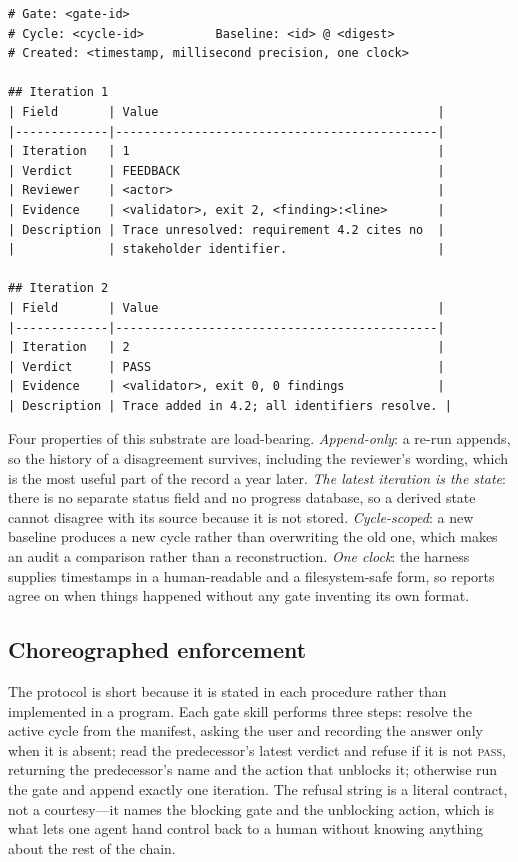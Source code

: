 \documentclass[10pt,a4paper]{article}
\theoremstyle{definition}
\theoremstyle{plain}
\theoremstyle{principle}
\begin{document}
\begin{lstlisting}[caption={A gate report after two iterations. The latest iteration \emph{is} the
gate state; earlier iterations are history that is never edited.},label={lst:report}]
# Gate: <gate-id>
# Cycle: <cycle-id>          Baseline: <id> @ <digest>
# Created: <timestamp, millisecond precision, one clock>

## Iteration 1
| Field       | Value                                       |
|-------------|---------------------------------------------|
| Iteration   | 1                                           |
| Verdict     | FEEDBACK                                    |
| Reviewer    | <actor>                                     |
| Evidence    | <validator>, exit 2, <finding>:<line>       |
| Description | Trace unresolved: requirement 4.2 cites no  |
|             | stakeholder identifier.                     |

## Iteration 2
| Field       | Value                                       |
|-------------|---------------------------------------------|
| Iteration   | 2                                           |
| Verdict     | PASS                                        |
| Evidence    | <validator>, exit 0, 0 findings             |
| Description | Trace added in 4.2; all identifiers resolve. |
\end{lstlisting}

Four properties of this substrate are load-bearing. \emph{Append-only}: a re-run appends, so the
history of a disagreement survives, including the reviewer's wording, which is the most useful
part of the record a year later. \emph{The latest iteration is the state}: there is no separate
status field and no progress database, so a derived state cannot disagree with its source because
it is not stored. \emph{Cycle-scoped}: a new baseline produces a new cycle rather than overwriting
the old one, which makes an audit a comparison rather than a reconstruction. \emph{One clock}: the
harness supplies timestamps in a human-readable and a filesystem-safe form, so reports agree on
when things happened without any gate inventing its own format.

\subsection{Choreographed enforcement}

The protocol is short because it is stated in each procedure rather than implemented in a program.
Each gate skill performs three steps: resolve the active cycle from the manifest, asking the user
and recording the answer only when it is absent; read the predecessor's latest verdict and refuse
if it is not \textnormal{\textsc{pass}}, returning the predecessor's name and the action that unblocks it;
otherwise run the gate and append exactly one iteration. The refusal string is a literal contract,
not a courtesy---it names the blocking gate and the unblocking action, which is what lets one agent
hand control back to a human without knowing anything about the rest of the chain.
\end{document}
